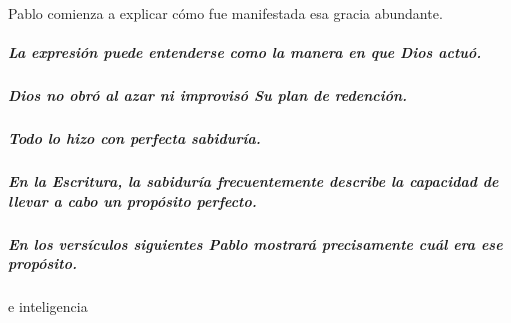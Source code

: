 \documentclass[11pt]{article}
\begin{document}
\begin{anchorblock}{Pablo comienza a explicar cómo fue manifestada esa gracia abundante.}

\subparagraph{La expresión puede entenderse como la manera en que Dios
actuó.}\label{la-expresiuxf3n-puede-entenderse-como-la-manera-en-que-dios-actuuxf3.}

\subparagraph{Dios no obró al azar ni improvisó Su plan de
redención.}\label{dios-no-obruxf3-al-azar-ni-improvisuxf3-su-plan-de-redenciuxf3n.}

\subparagraph{Todo lo hizo con perfecta
sabiduría.}\label{todo-lo-hizo-con-perfecta-sabiduruxeda.}

\subparagraph{En la Escritura, la sabiduría frecuentemente describe la
capacidad de llevar a cabo un propósito
perfecto.}\label{en-la-escritura-la-sabiduruxeda-frecuentemente-describe-la-capacidad-de-llevar-a-cabo-un-propuxf3sito-perfecto.}

\subparagraph{En los versículos siguientes Pablo mostrará precisamente
cuál era ese
propósito.}\label{en-los-versuxedculos-siguientes-pablo-mostraruxe1-precisamente-cuuxe1l-era-ese-propuxf3sito.}

\end{anchorblock}

\begin{anchorblock}{e inteligencia}

\end{anchorblock}
\end{document}
